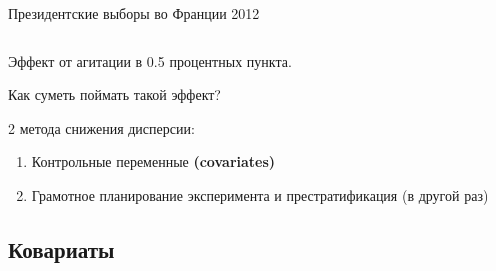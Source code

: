 \begin{frame}{Президентские выборы во Франции 2012 \parencite{pons2018will}}
\begin{columns}
\end{columns}
Эффект от агитации в 0.5 процентных пункта. 
\end{frame}

\begin{frame}{Как суметь поймать такой эффект?}

2 метода снижения дисперсии:
\begin{enumerate}
    \item Контрольные переменные \textbf{(covariates)}
    \item Грамотное планирование эксперимента и престратификация (в другой раз)
\end{enumerate}
    
\end{frame}

\subsection{Ковариаты}

